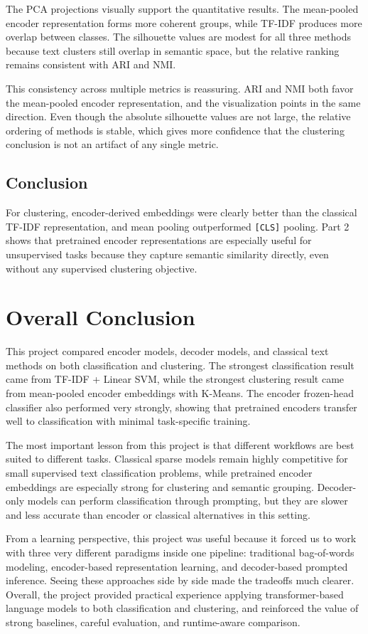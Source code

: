 \documentclass{article}
\begin{document}
The PCA projections visually support the quantitative results. The mean-pooled encoder representation forms more coherent groups, while TF-IDF produces more overlap between classes. The silhouette values are modest for all three methods because text clusters still overlap in semantic space, but the relative ranking remains consistent with ARI and NMI.

This consistency across multiple metrics is reassuring. ARI and NMI both favor the mean-pooled encoder representation, and the visualization points in the same direction. Even though the absolute silhouette values are not large, the relative ordering of methods is stable, which gives more confidence that the clustering conclusion is not an artifact of any single metric.

\subsection{Conclusion}

For clustering, encoder-derived embeddings were clearly better than the classical TF-IDF representation, and mean pooling outperformed \texttt{[CLS]} pooling. Part 2 shows that pretrained encoder representations are especially useful for unsupervised tasks because they capture semantic similarity directly, even without any supervised clustering objective.

\section{Overall Conclusion}

This project compared encoder models, decoder models, and classical text methods on both classification and clustering. The strongest classification result came from TF-IDF + Linear SVM, while the strongest clustering result came from mean-pooled encoder embeddings with K-Means. The encoder frozen-head classifier also performed very strongly, showing that pretrained encoders transfer well to classification with minimal task-specific training.

The most important lesson from this project is that different workflows are best suited to different tasks. Classical sparse models remain highly competitive for small supervised text classification problems, while pretrained encoder embeddings are especially strong for clustering and semantic grouping. Decoder-only models can perform classification through prompting, but they are slower and less accurate than encoder or classical alternatives in this setting.

From a learning perspective, this project was useful because it forced us to work with three very different paradigms inside one pipeline: traditional bag-of-words modeling, encoder-based representation learning, and decoder-based prompted inference. Seeing these approaches side by side made the tradeoffs much clearer. Overall, the project provided practical experience applying transformer-based language models to both classification and clustering, and reinforced the value of strong baselines, careful evaluation, and runtime-aware comparison.
\end{document}
